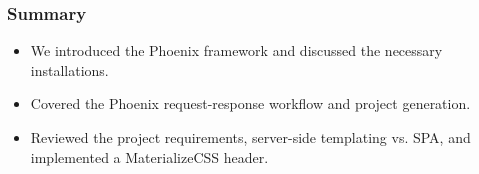 \documentclass[aspectratio=169, table]{beamer}
\begin{document}
	\begin{frame}
		\frametitle{Summary}
		\begin{itemize}
			\item We introduced the Phoenix framework and discussed the necessary installations.
			\item Covered the Phoenix request-response workflow and project generation.
			\item Reviewed the project requirements, server-side templating vs. SPA, and implemented a MaterializeCSS header.
		\end{itemize}
	\end{frame}
	
\end{document}
